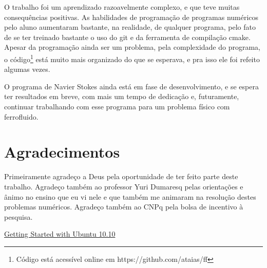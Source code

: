 \documentclass[journal]{IEEEtran}
\begin{document}
O trabalho foi um aprendizado razoavelmente complexo, e que teve muitas consequências positivas. As habilidades de programação de programas numéricos pelo aluno aumentaram bastante, na realidade, de qualquer programa, pelo fato de se ter treinado bastante o uso do git e da ferramenta de compilação cmake. Apesar da programação ainda ser um problema, pela complexidade do programa, o código\footnote{Código está acessível online em https://github.com/ataias/ff} está muito mais organizado do que se esperava, e pra isso ele foi refeito algumas vezes.

O programa de Navier Stokes ainda está em fase de desenvolvimento, e se espera ter resultados em breve, com mais um tempo de dedicação e, futuramente, continuar trabalhando com esse programa para um problema físico com ferrofluido.

\section*{Agradecimentos}

Primeiramente agradeço a Deus pela oportunidade de ter feito parte deste trabalho. Agradeço também ao professor Yuri Dumaresq pelas orientações e ânimo no ensino que eu vi nele e que também me animaram na resolução destes problemas numéricos. Agradeço também ao CNPq pela bolsa de incentivo à pesquisa.

\begin{thebibliography}{4}
  
 \href{ftp://ftp.fisio.cinvestav.mx/Manuales/linux/Getting\%20Started\%20with\%20Ubuntu\%2010.10.pdf}{Getting Started with Ubuntu 10.10}
\end{thebibliography}
\end{document}
